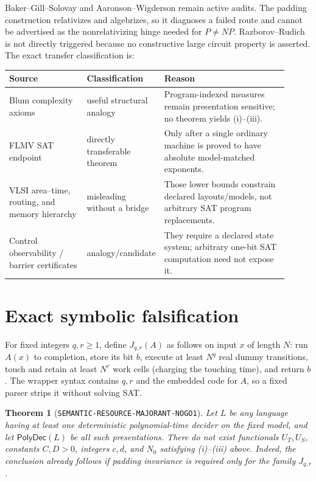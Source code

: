 \documentclass[11pt]{article}
\newtheorem{theorem}{Theorem}
\begin{document}
Baker--Gill--Solovay and Aaronson--Wigderson remain active audits.  The padding
construction relativizes and algebrizes, so it diagnoses a failed route and
cannot be advertised as the nonrelativizing hinge needed for $P\ne NP$.
Razborov--Rudich is not directly triggered because no constructive large
circuit property is asserted.  The exact transfer classification is:
\begin{center}
\begin{tabular}{p{0.28\linewidth}p{0.18\linewidth}p{0.45\linewidth}}
\toprule
Source & Classification & Reason \\
\midrule
Blum complexity axioms & useful structural analogy & Program-indexed measures
remain presentation sensitive; no theorem yields (i)--(iii). \\
FLMV SAT endpoint & directly transferable theorem & Only after a single
ordinary machine is proved to have absolute model-matched exponents. \\
VLSI area--time, routing, and memory hierarchy & misleading without a bridge &
Those lower bounds constrain declared layouts/models, not arbitrary SAT
program replacements. \\
Control observability / barrier certificates & analogy/candidate & They require
a declared state system; arbitrary one-bit SAT computation need not expose it. \\
\bottomrule
\end{tabular}
\end{center}

\section{Exact symbolic falsification}

For fixed integers $q,r\ge1$, define $J_{q,r}(A)$ as follows on input $x$ of
length $N$: run $A(x)$ to completion, store its bit $b$, execute at least
$N^q$ real dummy transitions, touch and retain at least $N^r$ work cells
(charging the touching time), and return $b$.  The wrapper syntax contains
$q,r$ and the embedded code for $A$, so a fixed parser strips it without
solving SAT.

\begin{theorem}[\texttt{SEMANTIC-RESOURCE-MAJORANT-NOGO1}]
Let $L$ be any language having at least one deterministic polynomial-time
decider on the fixed model, and let $\mathsf{PolyDec}(L)$ be all such
presentations.  There do not exist functionals $U_T,U_S$, constants
$C,D>0$, integers $c,d$, and $N_0$ satisfying (i)--(iii) above.  Indeed, the
conclusion already follows if padding invariance is required only for the
family $J_{q,r}$.
\end{theorem}
\end{document}
